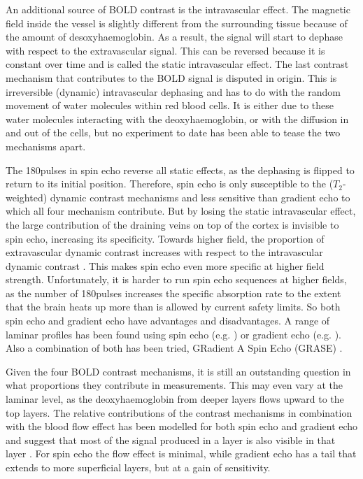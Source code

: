An additional source of BOLD contrast is the intravascular effect. The magnetic field inside the vessel is slightly different from the surrounding tissue because of the amount of desoxyhaemoglobin. As a result, the signal will start to dephase with respect to the extravascular signal. This can be reversed because it is constant over time and is called the static intravascular effect. The last contrast mechanism that contributes to the BOLD signal is disputed in origin. This is irreversible (dynamic) intravascular dephasing and has to do with the random movement of water molecules within red blood cells. It is either due to these water molecules interacting with the deoxyhaemoglobin, or with the diffusion in and out of the cells, but no experiment to date has been able to tease the two mechanisms apart.

The 180\textdegree pulses in spin echo reverse all static effects, as the dephasing is flipped to return to its initial position. Therefore, spin echo is only susceptible to the ($T_2$-weighted) dynamic contrast mechanisms and less sensitive than gradient echo to which all four mechanism contribute. But by losing the static intravascular effect, the large contribution of the draining veins on top of the cortex is invisible to spin echo, increasing its specificity. Towards higher field, the proportion of extravascular dynamic contrast increases with respect to the intravascular dynamic contrast \cite{Norris2002,Jochimsen2004,Norris2006}. This makes spin echo even more specific at higher field strength. Unfortunately, it is harder to run spin echo sequences at higher fields, as the number of 180\textdegree pulses increases the specific absorption rate to the extent that the brain heats up more than is allowed by current safety limits. So both spin echo and gradient echo have advantages and disadvantages. A range of laminar profiles has been found using spin echo (e.g. \cite{Zhao2004,Harel2006,Goense2006}) or gradient echo (e.g. \cite{Polimeni2010,DeMartino2013,Chen2013}). Also a combination of both has been tried, GRadient A Spin Echo (GRASE) \cite{Olman2012,DeMartino2013}.

Given the four BOLD contrast mechanisms, it is still an outstanding question in what proportions they contribute in measurements. This may even vary at the laminar level, as the deoxyhaemoglobin from deeper layers flows upward to the top layers. The relative contributions of the contrast mechanisms in combination with the blood flow effect has been modelled for both spin echo and gradient echo and suggest that most of the signal produced in a layer is also visible in that layer \cite{Markuerkiaga2016,Uludag2017}. For spin echo the flow effect is minimal, while gradient echo has a tail that extends to more superficial layers, but at a gain of sensitivity. 

